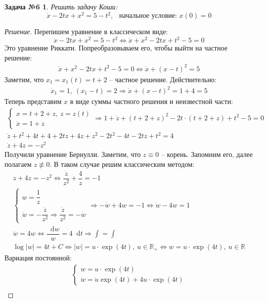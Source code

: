 \documentclass[a4paper,12pt]{article}
\newtheorem*{task6}{Задача №6}
\newcommand{\R}{\mathbb{R}}
\renewcommand*\d{\mathop{}\!\mathrm{d}}
\newcommand{\dw}{\dot{w}}
\newcommand{\du}{\dot{u}}
\newcommand{\dx}{\dot{x}}
\newcommand{\dz}{\dot{z}}
\newcommand{\bto}{\Longrightarrow}
\newcommand{\ds}{\displaystyle}
\begin{document}
\begin{task6}
	Решить задачу Коши: \[\dx - 2tx + x^2 = 5 - t^2,\ \ \text{ начальное условие: }x(0) = 0\]
\end{task6}
\begin{proof}[Решение]
	Перепишем уравнение в классическом виде:
	\[\dx - 2tx + x^2 = 5 - t^2 \iff \dx + x^2 - 2tx + t^2 - 5 = 0\]
	Это уравнение Риккати. Попреобразовываем его, чтобы выйти на частное решение:
	\begin{gather*}
	\dx + x^2 - 2tx + t^2 - 5 = 0 \iff \dx + (x - t)^2 = 5
	\end{gather*}
	Заметим, что $x_1 = x_1(t) = t + 2$ -- частное решение. Действительно:
	\begin{gather*}
	\dx_1 = 1,\ (x_1 - t) = 2 \bto \dx + (x - t)^2 = 1 + 4 = 5
	\end{gather*}
	Теперь представим $x$ в виде суммы частного решения и неизвестной части:
	\begin{gather*}
	\begin{cases}
	x = t + 2 + z,\ z = z(t)\\
	\dx = 1 + \dz
	\end{cases} \bto 1 + \dz + (t + 2 + z)^2 -2t \cdot (t + 2 + z) + t^2 - 5 = 0\\
	\dz + t^2 + 4t + 4 + 2tz + 4z + z^2 - 2t^2 - 4t -2tz + t^2 = 4\\
	\dz + 4z = -z^2
	\end{gather*}
	Получили уравнение Бернулли. Заметим, что $z \equiv 0$ -- корень. Запомним его, далее полагаем $z \not\equiv 0$. В таком случае решим классическим методом:
	\begin{gather*}
	\dz + 4z = -z^2 \iff \dfrac{\dz}{z^2} + \dfrac{4}{z} = -1\\
	\begin{cases}
	w = \dfrac{1}{z}\\
	\dw = -\dfrac{\dz}{z^2} \Longrightarrow \dfrac{\dz}{z^2} = -\dw
	\end{cases} \bto -\dw + 4w = -1 \iff \dw  - 4w = 1\\
	\dw = 4w \iff \dfrac{\d w}{w} = 4\d t \bto \ds\int = \int \\
	\log|w| = 4t + C \iff |w| = u\cdot \exp(4t),\ u \in \R_+ \iff w = u \cdot \exp(4t),\ u \in \R
	\end{gather*}
	Вариация постоянной:
	\begin{gather*}
	\begin{cases}
	w = u \cdot \exp(4t)\\
	\dw = \du\exp(4t) + 4u\cdot \exp(4t)
	\end{cases}\\

\end{gather*}
\end{proof}
\end{document}
